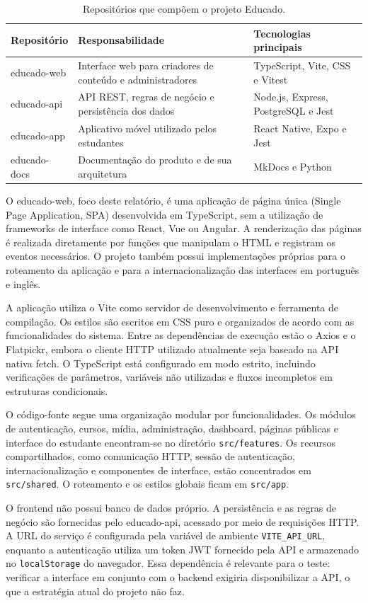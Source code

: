 \begin{table}[H]
\centering
\caption{Repositórios que compõem o projeto Educado.}
\label{tab:repositorios}
\begin{tabularx}{\textwidth}{l X X}
\toprule
\textbf{Repositório} & \textbf{Responsabilidade} & \textbf{Tecnologias principais} \\
\midrule
educado-web & Interface web para criadores de conteúdo e administradores & TypeScript, Vite, CSS e Vitest \\
educado-api & API REST, regras de negócio e persistência dos dados & Node.js, Express, PostgreSQL e Jest \\
educado-app & Aplicativo móvel utilizado pelos estudantes & React Native, Expo e Jest \\
educado-docs & Documentação do produto e de sua arquitetura & MkDocs e Python \\
\bottomrule
\end{tabularx}
\end{table}

O educado-web, foco deste relatório, é uma aplicação de página única (Single Page Application, SPA) desenvolvida em TypeScript, sem a utilização de frameworks de interface como React, Vue ou Angular.
A renderização das páginas é realizada diretamente por funções que manipulam o HTML e registram os eventos necessários.
O projeto também possui implementações próprias para o roteamento da aplicação e para a internacionalização das interfaces em português e inglês.

A aplicação utiliza o Vite como servidor de desenvolvimento e ferramenta de compilação.
Os estilos são escritos em CSS puro e organizados de acordo com as funcionalidades do sistema.
Entre as dependências de execução estão o Axios e o Flatpickr, embora o cliente HTTP utilizado atualmente seja baseado na API nativa fetch.
O TypeScript está configurado em modo estrito, incluindo verificações de parâmetros, variáveis não utilizadas e fluxos incompletos em estruturas condicionais.

O código-fonte segue uma organização modular por funcionalidades.
Os módulos de autenticação, cursos, mídia, administração, dashboard, páginas públicas e interface do estudante encontram-se no diretório \texttt{src/features}.
Os recursos compartilhados, como comunicação HTTP, sessão de autenticação, internacionalização e componentes de interface, estão concentrados em \texttt{src/shared}.
O roteamento e os estilos globais ficam em \texttt{src/app}.

O frontend não possui banco de dados próprio.
A persistência e as regras de negócio são fornecidas pelo educado-api, acessado por meio de requisições HTTP.
A URL do serviço é configurada pela variável de ambiente \texttt{VITE\_API\_URL}, enquanto a autenticação utiliza um token JWT fornecido pela API e armazenado no \texttt{localStorage} do navegador.
Essa dependência é relevante para o teste: verificar a interface em conjunto com o backend exigiria disponibilizar a API, o que a estratégia atual do projeto não faz.

